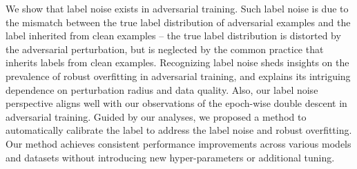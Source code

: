 


We show that label noise exists in adversarial training. 
Such label noise is due to the mismatch between the true label distribution of adversarial examples and the label inherited from clean examples 
 -- the true label distribution is distorted by the adversarial perturbation, but is neglected by the common practice that inherits labels from clean examples. 
Recognizing label noise sheds insights on the prevalence of robust overfitting in adversarial training, and explains its intriguing dependence on perturbation radius and data quality. 
Also, our label noise perspective aligns well with our observations of the epoch-wise double descent in adversarial training. 
Guided by our analyses, we proposed a method to automatically calibrate the label to address the label noise and robust overfitting. 
Our method achieves consistent performance improvements across various models and datasets without introducing  new hyper-parameters or additional tuning.




